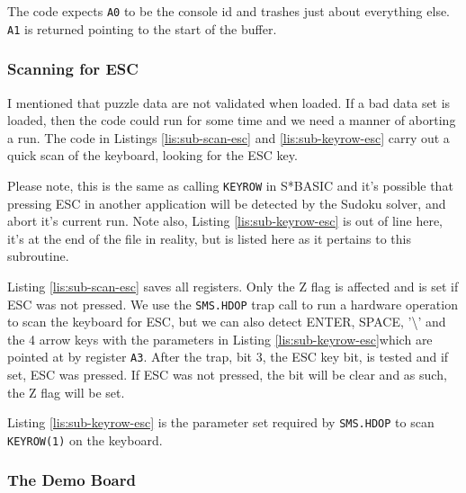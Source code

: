 The code expects \texttt{A0} to be the console id and trashes just
about everything else. \texttt{A1} is returned pointing to the start
of the buffer.

\subsubsection{Scanning for ESC}

I mentioned that puzzle data are not validated when loaded. If a bad
data set is loaded, then the code could run for some time and we need
a manner of aborting a run. The code in Listings \ref{lis:sub-scan-esc}
and \ref{lis:sub-keyrow-esc} carry out a quick scan of the keyboard,
looking for the ESC key.

Please note, this is the same as calling \texttt{KEYROW} in S{*}BASIC
and it's possible that pressing ESC in another application will be
detected by the Sudoku solver, and abort it's current run. Note also,
Listing \ref{lis:sub-keyrow-esc} is out of line here, it's at the
end of the file in reality, but is listed here as it pertains to this
subroutine.



Listing \ref{lis:sub-scan-esc} saves all registers. Only the Z flag
is affected and is set if ESC was not pressed. We use the \texttt{SMS.HDOP}
trap call to run a hardware operation to scan the keyboard for ESC,
but we can also detect ENTER, SPACE, '\textbackslash ' and the 4
arrow keys with the parameters in Listing \ref{lis:sub-keyrow-esc}which
are pointed at by register \texttt{A3}. After the trap, bit 3, the
ESC key bit, is tested and if set, ESC was pressed. If ESC was not
pressed, the bit will be clear and as such, the Z flag will be set.



Listing \ref{lis:sub-keyrow-esc} is the parameter set required by
\texttt{SMS.HDOP} to scan \texttt{KEYROW(1)} on the keyboard.

\subsubsection{The Demo Board}

